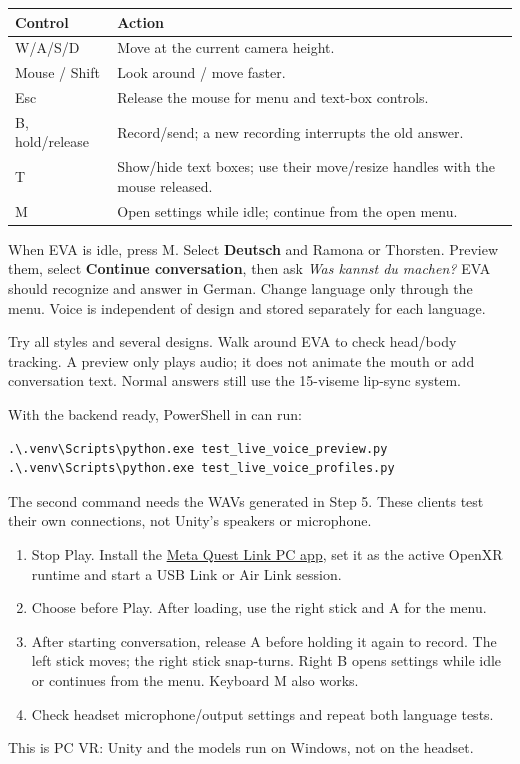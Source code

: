 \clearpage
{}
\begin{tabularx}{\linewidth}{@{}P{30mm}Y@{}}
\toprule
Control & Action\\
\midrule
W/A/S/D & Move at the current camera height.\\
Mouse / Shift & Look around / move faster.\\
Esc & Release the mouse for menu and text-box controls.\\
B, hold/release & Record/send; a new recording interrupts the old answer.\\
T & Show/hide text boxes; use their move/resize handles with the mouse released.\\
M & Open settings while idle; continue from the open menu.\\
\bottomrule
\end{tabularx}

When EVA is idle, press M. Select \textbf{Deutsch} and Ramona or Thorsten.
Preview them, select \textbf{Continue conversation}, then ask
\textit{Was kannst du machen?} EVA should recognize and answer in German.
Change language only through the menu. Voice is independent of design and
stored separately for each language.

Try all styles and several designs. Walk around EVA to check head/body tracking.
A preview only plays audio; it does not animate the mouth or add conversation
text. Normal answers still use the 15-viseme lip-sync system.

With the backend ready, PowerShell in  can run:
\begin{lstlisting}
.\.venv\Scripts\python.exe test_live_voice_preview.py
.\.venv\Scripts\python.exe test_live_voice_profiles.py
\end{lstlisting}
The second command needs the WAVs generated in Step 5. These clients test their
own connections, not Unity's speakers or microphone.

\clearpage
{}
\begin{enumerate}
\item Stop Play. Install the \href{https://www.meta.com/quest/setup/}{Meta Quest Link PC app},
set it as the active OpenXR runtime and start a USB Link or Air Link session.
\item Choose  before Play.
After loading, use the right stick and A for the menu.
\item After starting conversation, release A before holding it again to record.
The left stick moves; the right stick snap-turns. Right B opens settings while
idle or continues from the menu. Keyboard M also works.
\item Check headset microphone/output settings and repeat both language tests.
\end{enumerate}
This is PC VR: Unity and the models run on Windows, not on the headset.

